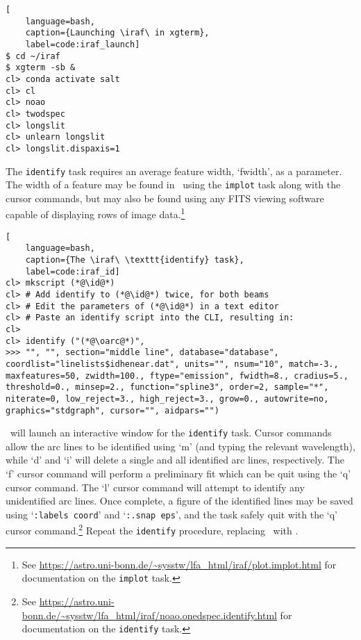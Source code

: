 \begin{lstlisting}[
    language=bash,
    caption={Launching \iraf\ in xgterm},
    label=code:iraf_launch]
$ cd ~/iraf
$ xgterm -sb &
cl> conda activate salt
cl> cl
cl> noao
cl> twodspec
cl> longslit
cl> unlearn longslit
cl> longslit.dispaxis=1
\end{lstlisting}

The \texttt{identify} task requires an average feature width, `fwidth', as a parameter. The width of a feature may be found in \iraf\ using the \texttt{implot} task along with the cursor commands, but may also be found using any \gls{FITS} viewing software capable of displaying rows of image data.\footnote{See \protect\url{https://astro.uni-bonn.de/~sysstw/lfa_html/iraf/plot.implot.html} for documentation on the \texttt{implot} task.}

\begin{lstlisting}[
    language=bash,
    caption={The \iraf\ \texttt{identify} task},
    label=code:iraf_id]
cl> mkscript (*@\id@*)
cl> # Add identify to (*@\id@*) twice, for both beams
cl> # Edit the parameters of (*@\id@*) in a text editor
cl> # Paste an identify script into the CLI, resulting in:
cl> 
cl> identify ("(*@\oarc@*)",
>>> "", "", section="middle line", database="database", coordlist="linelists$idhenear.dat", units="", nsum="10", match=-3., maxfeatures=50, zwidth=100., ftype="emission", fwidth=8., cradius=5., threshold=0., minsep=2., function="spline3", order=2, sample="*", niterate=0, low_reject=3., high_reject=3., grow=0., autowrite=no, graphics="stdgraph", cursor="", aidpars="")
\end{lstlisting}

\iraf\ will launch an interactive window for the \texttt{identify} task. Cursor commands allow the arc lines to be identified using `m' (and typing the relevant wavelength), while `d' and `i' will delete a single and all identified arc lines, respectively. The `f' cursor command will perform a preliminary fit which can be quit using the `q' cursor command. The `l' cursor command will attempt to identify any unidentified arc lines. Once complete, a figure of the identified lines may be saved using `\texttt{:labels coord}' and `\texttt{:.snap eps}', and the task safely quit with the `q' cursor command.\footnote{See \protect\url{https://astro.uni-bonn.de/~sysstw/lfa_html/iraf/noao.onedspec.identify.html} for documentation on the \texttt{identify} task.} Repeat the \texttt{identify} procedure, replacing \oarc\ with \earc.

